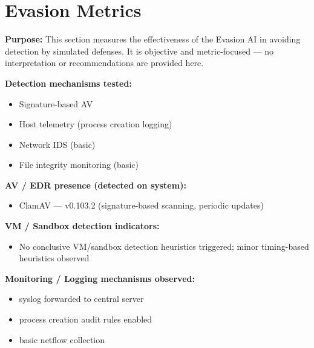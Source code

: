 \documentclass[a4paper,12pt]{article}
\begin{document}
\newpage


\section*{Evasion Metrics}

\textbf{Purpose:} This section measures the effectiveness of the Evasion AI in avoiding detection by simulated defenses. It is objective and metric-focused — no interpretation or recommendations are provided here.

\vspace{0.3cm}
\textbf{Detection mechanisms tested:}
\begin{itemize}
    
        
            \item Signature-based AV
        
            \item Host telemetry (process creation logging)
        
            \item Network IDS (basic)
        
            \item File integrity monitoring (basic)
        
    
\end{itemize}

\textbf{AV / EDR presence (detected on system):}
\begin{itemize}
    
        
            \item ClamAV — v0.103.2 (signature-based scanning, periodic updates)
        
    
\end{itemize}

\textbf{VM / Sandbox detection indicators:}
\begin{itemize}
    
        \item No conclusive VM/sandbox detection heuristics triggered; minor timing-based heuristics observed
    
\end{itemize}

\textbf{Monitoring / Logging mechanisms observed:}
\begin{itemize}
    
        
            \item syslog forwarded to central server
        
            \item process creation audit rules enabled
        
            \item basic netflow collection
        
    
\end{itemize}
\end{document}
